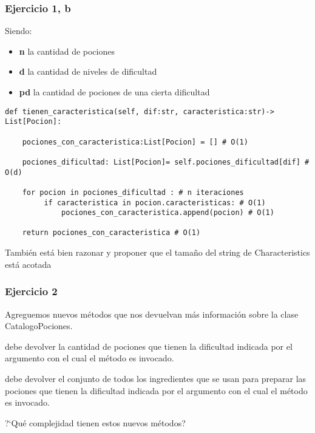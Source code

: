
\begin{frame}[fragile]\frametitle{Ejercicio 1, b}
	
	Siendo: 
	\begin{itemize}
		\item \textbf{n} la cantidad de pociones
		\item \textbf{d} la cantidad de niveles de dificultad
		\item \textbf{pd} la cantidad de pociones de una cierta dificultad
	\end{itemize}
	 
	\begin{lstlisting}[style=python,numbers=none,basicstyle=\ttfamily\tiny]
def tienen_caracteristica(self, dif:str, caracteristica:str)-> List[Pocion]:

    pociones_con_caracteristica:List[Pocion] = [] # O(1)

    pociones_dificultad: List[Pocion]= self.pociones_dificultad[dif] # O(d)

    for pocion in pociones_dificultad : # n iteraciones
         if caracteristica in pocion.caracteristicas: # O(1)
             pociones_con_caracteristica.append(pocion) # O(1)

    return pociones_con_caracteristica # O(1)

	\end{lstlisting}
	
Tambi\'en est\'a bien razonar y proponer que el tama\~no del string de Characteristics est\'a acotada
	
\end{frame}


\begin{frame}[fragile]\frametitle{Ejercicio 2}

Agreguemos nuevos m\'etodos que nos devuelvan m\'as informaci\'on sobre la clase CatalogoPociones.\bigskip

  debe devolver la cantidad de pociones que tienen la dificultad indicada por el argumento con el cual el m\'etodo es invocado.\medskip

  debe devolver el conjunto de todos los ingredientes que se usan para preparar las pociones que tienen la dificultad indicada por el argumento con el cual el m\'etodo es invocado.\bigskip

 ?`Qu\'e complejidad tienen estos nuevos m\'etodos?

\end{frame}




